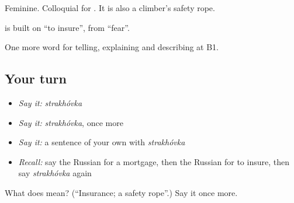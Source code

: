 Feminine. Colloquial for \emph{}. It is also a climber’s safety rope.

\begin{cousinweb}
\textbf{} is built on \emph{} \textquotedblleft{}to insure\textquotedblright{}, from \emph{} \textquotedblleft{}fear\textquotedblright{}.
\end{cousinweb}

\begin{grammarlens}[title={What you've built}]
One more word for telling, explaining and describing at B1.
\end{grammarlens}

\subsection*{Your turn}
\begin{itemize}
\raggedright
  \item \emph{Say it:} \emph{strakhóvka}
  \item \emph{Say it:} \emph{strakhóvka}, once more
  \item \emph{Say it:} a sentence of your own with \emph{strakhóvka}
  \item \emph{Recall:} say the Russian for a mortgage, then the Russian for to insure, then say \emph{strakhóvka} again
\end{itemize}

\begin{tcolorbox}[breakable,colback=teal!4,colframe=teal!35!black,title={Before you move on}]
What does  mean? (\textquotedblleft{}Insurance; a safety rope\textquotedblright{}.) Say it once more.
\end{tcolorbox}
